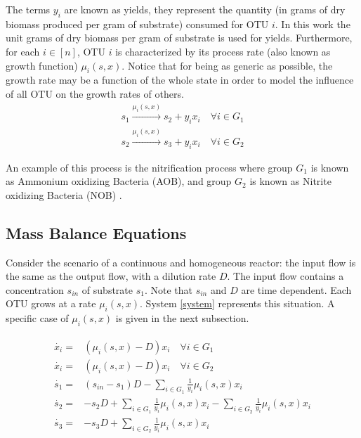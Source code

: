 \documentclass[3p,times]{article}
\begin{document}
The terms $y_i$ are known as yields, they represent the quantity (in grams of dry biomass produced per gram of substrate) consumed for OTU $i$. In this work the unit grams of dry biomass per gram of substrate is used for yields. Furthermore, for each $ i \in [n]$, OTU $i$ is characterized by its process rate (also known as growth function) $\mu_i(s,x)$. Notice that for being as generic as possible, the growth rate may be a function of the whole state in order to model the influence of all OTU on the growth rates of others.
\begin{align}
\label{Reaction1} \tag{R G1} s_1 \stackrel{\mu_i(s,x)}{\longrightarrow} s_2 + y_ix_i \quad \forall i \in G_1 \\
\label{Reaction2} \tag{R G2} s_2\stackrel{\mu_i(s,x)}{\longrightarrow} s_3 + y_ix_i \quad \forall i \in G_2
\end{align}

An example of this process is the nitrification process where group $G_1$ is known as Ammonium oxidizing Bacteria (AOB), and group $G_2$ is known as Nitrite oxidizing Bacteria (NOB) \cite{SHARMA1977897}.
\subsection{Mass Balance Equations}

Consider the scenario of a continuous and homogeneous reactor: the input flow is the same as the output flow, with a dilution rate $D$. The input flow contains a concentration $s_{in}$ of substrate $s_1$. Note that $s_{in}$ and $D$ are time dependent. Each OTU grows at a rate $\mu_i(s,x)$. System \eqref{system} represents this situation. A specific case of $\mu_i(s,x)$ is given in the next subsection. 

\begin{align} 
\label{system}
\begin{array}{cl}
\dot{x_i} =& \left(\mu_i(s,x) -D \right)x_i \quad \forall i \in G_1\\
\dot{x_i} =& \left(\mu_i(s,x) -D \right)x_i \quad \forall i \in G_2 \\
\dot{s_1} =& \displaystyle (s_{in}-s_1)D-\sum\limits_{i\in G_1} \frac{1}{y_i}\mu_i(s,x) x_i  \\
\dot{s_2} = & \displaystyle -s_2D+\sum\limits_{i\in G_1}\frac{1}{y_i}\mu_i(s,x)x_i 		-\sum\limits_{i\in G_2}\frac{1}{y_i}\mu_i(s,x) x_i  \\
\dot{s_3} =&  \displaystyle -s_3D+\sum\limits_{i\in G_2}\frac{1}{y_i}\mu_i(s,x) x_i 
\end{array}
\end{align}	
\end{document}
